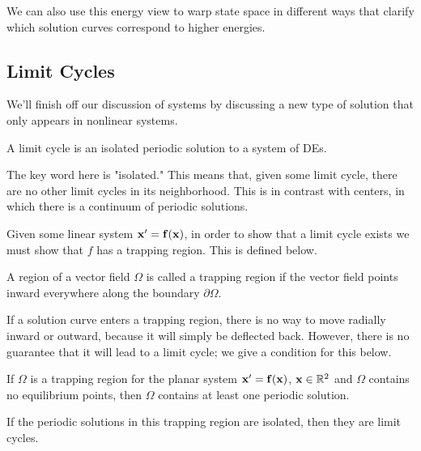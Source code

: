 \documentclass[../m082main.tex]{subfiles}
\begin{document}
We can also use this energy view to warp state space in different ways that clarify which solution curves correspond to higher energies.

\subsection{Limit Cycles}
We'll finish off our discussion of systems by discussing a new type of solution that only appears in nonlinear systems.

\begin{definition}
    A limit cycle is an isolated periodic solution to a system of DEs.
\end{definition}

The key word here is "isolated."
This means that, given some limit cycle, there are no other limit cycles in its neighborhood.
This is in contrast with centers, in which there is a continuum of periodic solutions.

Given some linear system $\mathbf{x}' = \mathbf{f} (\mathbf{x})$, in order to show that a limit cycle exists we must show that $f$ has a trapping region.
This is defined below.

\begin{definition}
    A region of a vector field $\Omega$ is called a trapping region if the vector field points inward everywhere along the boundary $\partial \Omega$.
\end{definition}

If a solution curve enters a trapping region, there is no way to move radially inward or outward, because it will simply be deflected back.
However, there is no guarantee that it will lead to a limit cycle; we give a condition for this below.

\begin{theorem}
    If $\Omega$ is a trapping region for the planar system $\mathbf{x}' = \mathbf{f}(\mathbf{x})$, $\mathbf{x} \in \mathbb{R}^2$ and $\Omega$ contains no equilibrium points, then $\Omega$ contains at least one periodic solution.
\end{theorem}

If the periodic solutions in this trapping region are isolated, then they are limit cycles.
\end{document}
